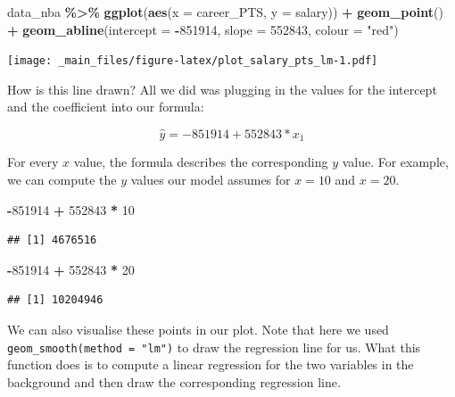\documentclass[
]{book}
\newenvironment{Shaded}{\begin{snugshade}}{\end{snugshade}}
\newcommand{\AttributeTok}[1]{\textcolor[rgb]{0.13,0.29,0.53}{#1}}
\newcommand{\DecValTok}[1]{\textcolor[rgb]{0.00,0.00,0.81}{#1}}
\newcommand{\FunctionTok}[1]{\textcolor[rgb]{0.13,0.29,0.53}{\textbf{#1}}}
\newcommand{\NormalTok}[1]{#1}
\newcommand{\SpecialCharTok}[1]{\textcolor[rgb]{0.81,0.36,0.00}{\textbf{#1}}}
\newcommand{\StringTok}[1]{\textcolor[rgb]{0.31,0.60,0.02}{#1}}
\begin{document}
\begin{Shaded}
\begin{Highlighting}[]
\NormalTok{data\_nba }\SpecialCharTok{\%\textgreater{}\%} 
  \FunctionTok{ggplot}\NormalTok{(}\FunctionTok{aes}\NormalTok{(}\AttributeTok{x =}\NormalTok{ career\_PTS, }\AttributeTok{y =}\NormalTok{ salary)) }\SpecialCharTok{+}
  \FunctionTok{geom\_point}\NormalTok{() }\SpecialCharTok{+}
  \FunctionTok{geom\_abline}\NormalTok{(}\AttributeTok{intercept =} \SpecialCharTok{{-}}\DecValTok{851914}\NormalTok{, }\AttributeTok{slope =} \DecValTok{552843}\NormalTok{, }\AttributeTok{colour =} \StringTok{"red"}\NormalTok{)}
\end{Highlighting}
\end{Shaded}

\texttt{[image: \_main\_files/figure-latex/plot\_salary\_pts\_lm-1.pdf]}

How is this line drawn? All we did was plugging in the values for the intercept
and the coefficient into our formula:

\[\hat{y} = -851914 + 552843 * x_1\]

For every \(x\) value, the formula describes the corresponding \(y\)
value. For example, we can compute the \(y\) values our model assumes for \(x = 10\)
and \(x = 20\).

\begin{Shaded}
\begin{Highlighting}[]
\SpecialCharTok{{-}}\DecValTok{851914} \SpecialCharTok{+} \DecValTok{552843} \SpecialCharTok{*} \DecValTok{10}
\end{Highlighting}
\end{Shaded}

\begin{verbatim}
## [1] 4676516
\end{verbatim}

\begin{Shaded}
\begin{Highlighting}[]
\SpecialCharTok{{-}}\DecValTok{851914} \SpecialCharTok{+} \DecValTok{552843} \SpecialCharTok{*} \DecValTok{20}
\end{Highlighting}
\end{Shaded}

\begin{verbatim}
## [1] 10204946
\end{verbatim}

We can also visualise these points in our plot. Note that here we used
\texttt{geom\_smooth(method\ =\ "lm")} to draw the regression line for us. What this
function does is to compute a linear regression for the two variables in the
background and then draw the corresponding regression line.
\end{document}
